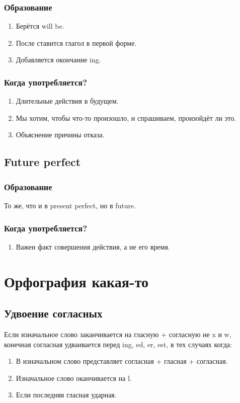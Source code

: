 \documentclass[oneside]{book}
\begin{document}
    \subsection{Образование}
    \begin{enumerate}
        \item Берётся will be.
        \item После ставится глагол в первой форме.
        \item Добавляется окончание ing.
    \end{enumerate}

    \subsection{Когда употребляется?}
    \begin{enumerate}
        \item Длительные действия в будущем.
        \item Мы хотим, чтобы что-то произошло, и спрашиваем, произойдёт ли это.
        \item Объяснение причины отказа.
    \end{enumerate}

    \section{Future perfect}
    \subsection{Образование}
    То же, что и в present perfect, но в future.

    \subsection{Когда употребляется?}
    \begin{enumerate}
        \item Важен факт совершения действия, а не его время.
    \end{enumerate}

    \chapter{Орфография какая-то}
    \section{Удвоение согласных}
    Если изначальное слово заканчивается на гласную + согласную не x и w, конечная
    согласная удваивается перед ing, ed, er, est,
    в тех случаях когда:
    \begin{enumerate}
        \item В изначальном слово представляет согласная + гласная + согласная.
        \item Изначальное слово оканчивается на l.
        \item Если последняя гласная ударная.
    \end{enumerate}
\end{document}
